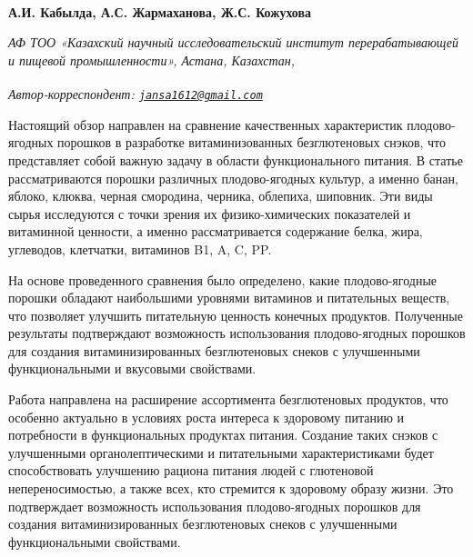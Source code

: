 
\begin{articleheader}

{\bfseries
А.И. Кабылда\authorid,
А.С. Жармаханова\authorid,
Ж.С. Кожухова\textsuperscript{\envelope } \authorid}
\end{articleheader}

\begin{affiliation}
\emph{АФ ТОО «Казахский научный исследовательский институт перерабатывающей и пищевой промышленности», Астана, Казахстан,}

\raggedright \textsuperscript{\envelope }{\em Автор-корреспондент: \href{mailto:jansa1612@gmail.com}{\nolinkurl{jansa1612@gmail.com}}}
\end{affiliation}

Настоящий обзор направлен на сравнение качественных характеристик
плодово-ягодных порошков в разработке витаминизованных безглютеновых
снэков, что представляет собой важную задачу в области функционального
питания. В статье рассматриваются порошки различных плодово-ягодных
культур, а именно банан, яблоко, клюква, черная смородина, черника,
облепиха, шиповник. Эти виды сырья исследуются с точки зрения их
физико-химических показателей и витаминной ценности, а именно
рассматривается содержание белка, жира, углеводов, клетчатки, витаминов
B1, A, C, PP.

На основе проведенного сравнения было определено, какие плодово-ягодные
порошки обладают наибольшими уровнями витаминов и питательных веществ,
что позволяет улучшить питательную ценность конечных продуктов.
Полученные результаты подтверждают возможность использования
плодово-ягодных порошков для создания витаминизированных безглютеновых
снеков с улучшенными функциональными и вкусовыми свойствами.

Работа направлена на расширение ассортимента безглютеновых продуктов,
что особенно актуально в условиях роста интереса к здоровому питанию и
потребности в функциональных продуктах питания. Создание таких снэков с
улучшенными органолептическими и питательными характеристиками будет
способствовать улучшению рациона питания людей с глютеновой
непереносимостью, а также всех, кто стремится к здоровому образу жизни.
Это подтверждает возможность использования плодово-ягодных порошков для
создания витаминизированных безглютеновых снеков с улучшенными
функциональными свойствами.

